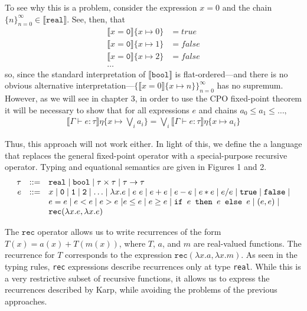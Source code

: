 To see why this is a problem, consider the expression $x = 0$ and the chain $\{n\}_{n=0}^{\infty} \in \llbracket 
\texttt{real} \rrbracket$. See, then, that
\begin{align*}
\llbracket x = \texttt{0} \rrbracket\{x \mapsto 0\} &= true \\
\llbracket x = \texttt{0} \rrbracket\{x \mapsto 1\} &= false \\
\llbracket x = \texttt{0} \rrbracket\{x \mapsto 2\} &= false \\
\ldots
\end{align*}
so, since the standard interpretation of $\llbracket \texttt{bool} \rrbracket$ is flat-ordered---and there is no obvious
alternative interpretation---$\{\llbracket x = 0\rrbracket\{x \mapsto n\}\}_{n=0}^{\infty}$ has no supremum. However, as we will see in chapter 3,
in order to use the CPO fixed-point theorem it will be necessary to show that for all expressions $e$
and chains $a_0 \leq a_1 \leq \ldots,$
\begin{align*}
  \llbracket \Gamma \vdash e : \tau \rrbracket\eta\{x\mapsto \bigvee_i a_i\}
  = \bigvee_i \llbracket \Gamma \vdash e : \tau \rrbracket\eta\{x \mapsto a_i\}
\end{align*}

Thus, this approach will not work either. In light of this, we define the a language that replaces the general fixed-point 
operator with a special-purpose recursive operator. Typing and equational semantics are given in Figures 1 and 2.
\[
\begin{array}{rcl}
\tau &::=& \texttt{real} \mid \texttt{bool} \mid \tau \times \tau \mid \tau \rightarrow \tau \\
e &::=& x  \mid \texttt{0} \mid \texttt{1} \mid \texttt{2} \mid \dotsc \mid \lambda x.e \mid e \ e \mid e + e \mid e - e \mid  e  *  e \mid e / e \mid \texttt{true} \mid \texttt{false} \mid \\
  && e  =  e \mid e < e \mid e > e \ | e \leq e \mid e \geq e \mid 
     \texttt{if } e \texttt{ then } e \texttt{ else } e \mid (e,e) \mid \\
    && \texttt{rec}(\lambda x.e, \lambda x.e) 
\end{array}
\]

The $\texttt{rec}$ operator allows us to write 
recurrences of the form $T(x) = a(x) + T(m(x))$, where $T$, $a$, and $m$ are real-valued functions.
The recurrence for $T$ corresponds to the expression $\texttt{rec}(\lambda x.a, \lambda x.m)$. As seen in the typing
rules, \texttt{rec} expressions describe recurrences only at type \texttt{real}.
 While this is a very restrictive subset of recursive functions, it allows us to express the recurrences described by 
Karp, while avoiding the problems of the previous approaches. 

